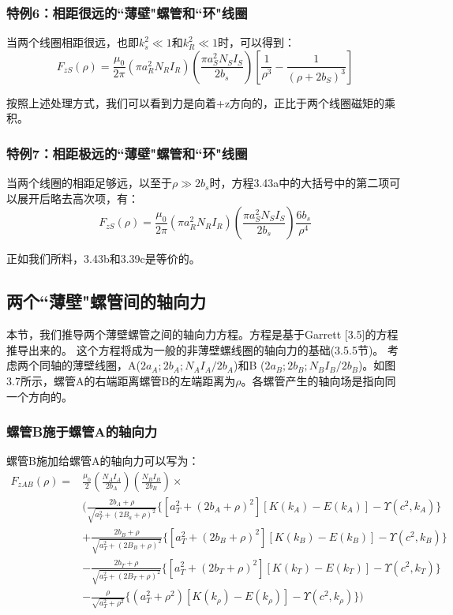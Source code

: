 \subsubsection{特例6：相距很远的``薄壁"螺管和``环"线圈}
当两个线圈相距很远，也即$k_s^2\ll 1$和$k_R^2\ll 1$时，可以得到：
\begin{equation}
F_{zS}(\rho)=\frac{\mu_0}{2\pi}(\pi a_R^2N_R I_R)(\frac{\pi a_S^2 N_S I_S}{2 b_s})\left[\frac{1}{\rho^3}-\frac{1}{(\rho+2b_S)^3}\right]
\end{equation}

按照上述处理方式，我们可以看到力是向着+z方向的，正比于两个线圈磁矩的乘积。

\subsubsection{特例7：相距极远的``薄壁"螺管和``环"线圈}
当两个线圈的相距足够远，以至于$\rho \gg 2b_s$时，方程3.43a中的大括号中的第二项可以展开后略去高次项，有：
\begin{equation*}
F_{zS}(\rho)=\frac{\mu_0}{2\pi}(\pi a_R^2 N_R I_R)(\frac{\pi a_S^2 N_S I_S}{2 b_s})\frac{6b_s}{\rho^4} \tag{3.43'}
\end{equation*}

正如我们所料，3.43b和3.39c是等价的。

\subsection{两个``薄壁"螺管间的轴向力}
本节，我们推导两个薄壁螺管之间的轴向力方程。方程是基于Garrett [3.5]的方程推导出来的。
这个方程将成为一般的非薄壁螺线圈的轴向力的基础(3.5.5节)。
考虑两个同轴的薄壁线圈，A($2a_A; 2b_A; N_A I_A/2b_A$)和B ($2a_B; 2b_B;
N_B I_B/2b_B$)。如图3.7所示，螺管A的右端距离螺管B的左端距离为$\rho$。各螺管产生的轴向场是指向同一个方向的。

\subsubsection{螺管B施于螺管A的轴向力}
螺管B施加给螺管A的轴向力可以写为：
\begin{equation}
\begin{split}
F_{zAB}(\rho)=&\frac{\mu_0}{2}(\frac{N_A I_A}{2b_A})(\frac{N_B I_B}{2b_B})\times \\
&\bigg(\frac{2b_A+\rho}{\sqrt{a_T^2+(2B_a+\rho)^2}} \{[a_T^2+(2b_A+\rho)^2][K(k_{A})-E(k_{A})]-\Upsilon(c^2,k_A)\}\\
&+\frac{2b_B+\rho}{\sqrt{a_T^2+(2B_B+\rho)^2}} \{[a_T^2+(2b_B+\rho)^2][K(k_{B})-E(k_{B})]-\Upsilon(c^2,k_B) \}\\
&-\frac{2b_T+\rho}{\sqrt{a_T^2+(2B_T+\rho)^2}} \{[a_T^2+(2b_T+\rho)^2][K(k_{T})-E(k_{T})]-\Upsilon(c^2,k_T) \}\\
&-\frac{\rho}{\sqrt{a_T^2+\rho^2}}\{(a_T^2+\rho^2)[K(k_\rho)-E(k_\rho)]-\Upsilon(c^2,k_\rho)\}\bigg)
\end{split}
\end{equation}

